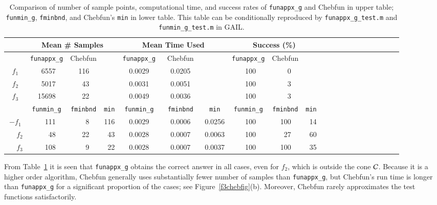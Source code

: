 \documentclass[review]{elsarticle}
\theoremstyle{definition}
\newcommand{\funappxg}{\texttt{funappx\_g}\xspace}
\newcommand{\funappxglobalg}{\texttt{funappxglobal\_g}\xspace}
\newcommand{\funming}{\texttt{funmin\_g}\xspace}
\newcommand{\fminbnd}{\texttt{fminbnd}\xspace}
\begin{document}
%
\begin{table}[bt]
	\centering
	\caption{Comparison of number of sample points, computational time,  and success
		rates of \funappxg  %
		and Chebfun in upper table;
		\funming, \fminbnd, and Chebfun's \texttt{min} in lower table.
		This table can be conditionally reproduced by
		\texttt{funappx\_g\_test.m} and \texttt{funmin\_g\_test.m}  in
		GAIL.\label{tab:localVsGlobalVsChebfun}}
	\medskip
	{\footnotesize
		\setlength{\tabcolsep}{0.35em} %
		\begin{tabular}{crrrrrrrrrrrrrrrrrrrrrrrrrrrrrrrr}	
			\toprule	
			& \multicolumn{7}{c}{\bf Mean \# Samples}
			& \multicolumn{7}{c}{\bf Mean Time Used}
			& \multicolumn{7}{c}{\bf Success (\%)}
			\\ \midrule
			&
			\multicolumn{3}{c}{\funappxg}  & \multicolumn{3}{c}{Chebfun} &&
			\multicolumn{3}{c}{\funappxg}  &  \multicolumn{3}{c}{Chebfun} &&
			\multicolumn{3}{c}{\funappxg}  &   \multicolumn{3}{c}{Chebfun}
			\\ \toprule
			$f_1$  &&
			6557 &&& 116  &&&&	0.0029  &&& 0.0205  &&&& 100  &&& 0
			\\
			$f_2$  &&
			5017  &&&  43 &&&&  0.0031  &&& 0.0051 &&&& 100  &&& 3
			\\
			$f_3$  &&
			15698 &&& 22  &&&& 0.0049  &&& 0.0036  &&&& 100  &&&  3 	
			\\ \bottomrule
			 &
			\multicolumn{3}{c}{\funming} &  \multicolumn{3}{c}{\fminbnd}  &
			\multicolumn{1}{c}{\texttt{min}} &
			\multicolumn{3}{c}{\funming}  &  \multicolumn{3}{c}{\fminbnd }  &
			\multicolumn{1}{c}{\texttt{min} }  &
			\multicolumn{3}{c}{\funming} & \multicolumn{3}{c}{\fminbnd} &
			\multicolumn{1}{c}{\texttt{min}}
			\\ \toprule
			$-f_1$   &&
			111&&&  8 && 116 &&  0.0029 &&& 0.0006 && 0.0256 &&
			100 &&& 100 && 14
			\\ $\phantom{-}f_2$ &&
			48 &&& 22 && 43 && 0.0028 &&& 0.0007 && 0.0063 &&
			100 &&& 27 && 60
			\\ $\phantom{-}f_3$ &&
			108 &&& 9 && 22 && 0.0028 &&& 0.0007 && 0.0037 &&
			100 &&&  100 && 35
			\\ \bottomrule
		\end{tabular}
	}
\end{table}


%

From Table~\ref{tab:localVsGlobalVsChebfun} it is seen that \funappxg{} obtains
the correct answer in all cases,
even for $f_2$, which is outside the cone $\mathcal{C}$. Because it is a higher order algorithm,
Chebfun generally uses substantially fewer number of samples than
\funappxg, but Chebfun's run time is longer than \funappxg for a
significant proportion of the cases; see Figure~\ref{f3chebfig}(b). Moreover, Chebfun
rarely approximates the test functions satisfactorily.
\end{document}
